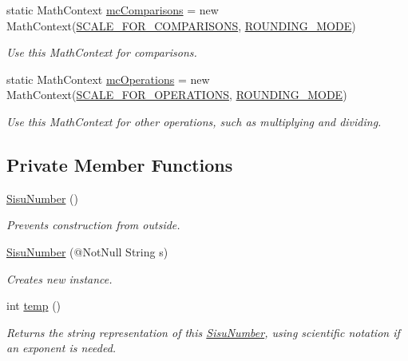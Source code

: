 \begin{DoxyCompactItemize}
static Math\+Context \hyperlink{classcom_1_1aarrelaakso_1_1drawl_1_1_sisu_number_a09a6e4440f1be870727ad0bc028fc237}{mc\+Comparisons} = new Math\+Context(\hyperlink{classcom_1_1aarrelaakso_1_1drawl_1_1_sisu_number_a9355f25a360283c24625dbdf2a397a0c}{S\+C\+A\+L\+E\+\_\+\+F\+O\+R\+\_\+\+C\+O\+M\+P\+A\+R\+I\+S\+O\+NS}, \hyperlink{classcom_1_1aarrelaakso_1_1drawl_1_1_sisu_number_a98077c422e928740febf571e3f2ec6b5}{R\+O\+U\+N\+D\+I\+N\+G\+\_\+\+M\+O\+DE})
\begin{DoxyCompactList}\small\item\em Use this Math\+Context for comparisons. \end{DoxyCompactList}\item 
static Math\+Context \hyperlink{classcom_1_1aarrelaakso_1_1drawl_1_1_sisu_number_a526b69c7921d715b6b49ad98ecf442fc}{mc\+Operations} = new Math\+Context(\hyperlink{classcom_1_1aarrelaakso_1_1drawl_1_1_sisu_number_ac514e84eda80c3673b5006716984670a}{S\+C\+A\+L\+E\+\_\+\+F\+O\+R\+\_\+\+O\+P\+E\+R\+A\+T\+I\+O\+NS}, \hyperlink{classcom_1_1aarrelaakso_1_1drawl_1_1_sisu_number_a98077c422e928740febf571e3f2ec6b5}{R\+O\+U\+N\+D\+I\+N\+G\+\_\+\+M\+O\+DE})
\begin{DoxyCompactList}\small\item\em Use this Math\+Context for other operations, such as multiplying and dividing. \end{DoxyCompactList}\end{DoxyCompactItemize}
\subsection*{Private Member Functions}
\begin{DoxyCompactItemize}
\item 
\hyperlink{classcom_1_1aarrelaakso_1_1drawl_1_1_sisu_number_a3e7b40170c4ae69461b94208a0f82f5e}{Sisu\+Number} ()
\begin{DoxyCompactList}\small\item\em Prevents construction from outside. \end{DoxyCompactList}\item 
\hyperlink{classcom_1_1aarrelaakso_1_1drawl_1_1_sisu_number_acf8044e59b44f921f3d4ad09152a35c2}{Sisu\+Number} (@Not\+Null String s)
\begin{DoxyCompactList}\small\item\em Creates new instance. \end{DoxyCompactList}\item 
int \hyperlink{classcom_1_1aarrelaakso_1_1drawl_1_1_sisu_number_a846e0834c619e63a8d85579484ab4276}{temp} ()
\begin{DoxyCompactList}\small\item\em Returns the string representation of this \hyperlink{classcom_1_1aarrelaakso_1_1drawl_1_1_sisu_number}{Sisu\+Number}, using scientific notation if an exponent is needed. \end{DoxyCompactList}\end{DoxyCompactItemize}
